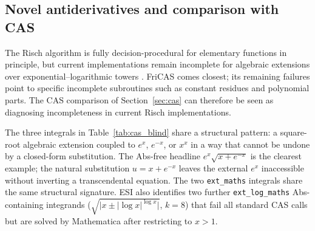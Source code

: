 \documentclass[preprint,12pt,authoryear]{elsarticle}
\newcommand{\codexadd}[1]{{\color{purple}#1}}
\newcommand{\hd}[1]{{\color{red}\textbf{[HD: #1]}}}
\begin{document}
\subsection{Novel antiderivatives and comparison with CAS}

The Risch algorithm \citep{Risch1969,Bronstein2005} is fully decision-procedural for elementary functions in principle, but current implementations remain incomplete for algebraic extensions over exponential--logarithmic towers \citep{Trager1976,Bronstein2005}. FriCAS \citep{FriCAS2024} comes closest; its remaining failures point to specific incomplete subroutines such as constant residues and polynomial parts.
The CAS comparison of Section~\ref{sec:cas} can therefore be seen as diagnosing incompleteness in current Risch implementations.

\codexadd{The three integrals in Table~\ref{tab:cas_blind} share a structural pattern: a square-root algebraic extension coupled to $e^x$, $e^{-x}$, or $x^x$ in a way that cannot be undone by a closed-form substitution. The Abs-free headline $e^x\sqrt{x+e^{-x}}$ is the clearest example; the natural substitution $u=x+e^{-x}$ leaves the external $e^x$ inaccessible without inverting a transcendental equation. The two \texttt{ext\_maths} integrals share the same structural signature. ESI also identifies two further \texttt{ext\_log\_maths} Abs-containing integrands ($\sqrt{\lvert x \pm \lvert\!\log x\rvert^{\log x}\rvert}$, $k=8$) that fail all standard CAS calls but are solved by Mathematica after restricting to $x>1$.}
\end{document}
